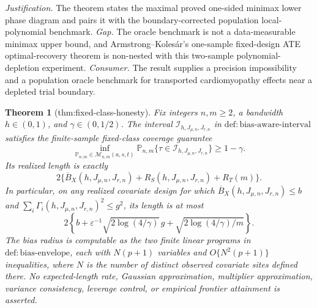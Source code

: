 \documentclass{article}
\newtheorem{theorem}{Theorem}
\begin{document}
\par\smallskip\noindent \textit{Justification.} The theorem states the maximal proved one-sided minimax lower phase diagram and pairs it with the boundary-corrected population local-polynomial benchmark. \textit{Gap.} The oracle benchmark is not a data-measurable minimax upper bound, and Armstrong--Kolesár's one-sample fixed-design ATE optimal-recovery theorem is non-nested with this two-sample polynomial-depletion experiment. \textit{Consumer.} The result supplies a precision impossibility and a population oracle benchmark for transported cardiomyopathy effects near a depleted trial boundary.

\begin{theorem}[thm:fixed-class-honesty]\label{thm:fixed-class-honesty}
Fix integers \(n,m\ge2\), a bandwidth \(h\in(0,1)\), and \(\gamma\in(0,1/2)\). The interval \(\mathcal I_{h,J_{\mu,n},J_{r,n}}\) in \(\mathrm{def:bias\text{-}aware\text{-}interval}\) satisfies the finite-sample fixed-class coverage guarantee
\[
\inf_{\mathbb P_{n,m}\in\mathcal M_{n,m}(a,s,t)}
\mathbb P_{n,m}\{\tau\in\mathcal I_{h,J_{\mu,n},J_{r,n}}\}\ge1-\gamma.
\]
Its realized length is exactly
\[
2\{\overline B_X(h,J_{\mu,n},J_{r,n})+R_S(h,J_{\mu,n},J_{r,n})+R_T(m)\}.
\]
In particular, on any realized covariate design for which \(\overline B_X(h,J_{\mu,n},J_{r,n})\le b\) and \(\sum_i\Gamma_i(h,J_{\mu,n},J_{r,n})^2\le g^2\), its length is at most
\[
2\left\{b+\varepsilon^{-1}\sqrt{2\log(4/\gamma)}\,g+\sqrt{2\log(4/\gamma)/m}\right\}.
\]
The bias radius is computable as the two finite linear programs in \(\mathrm{def:bias\text{-}envelope}\), each with \(N(p+1)\) variables and \(O\{N^2(p+1)\}\) inequalities, where \(N\) is the number of distinct observed covariate sites defined there. No expected-length rate, Gaussian approximation, multiplier approximation, variance consistency, leverage control, or empirical frontier attainment is asserted.
\end{theorem}
\end{document}
